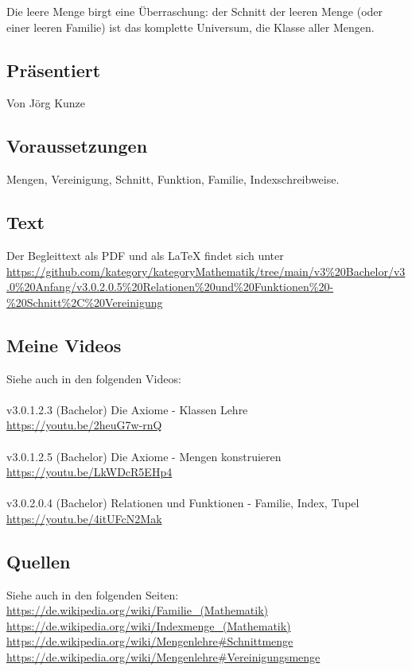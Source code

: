\documentclass[a4paper]{amsart}
\theoremstyle{definition}
\begin{document}
Die leere Menge birgt eine Überraschung: der Schnitt der leeren Menge (oder einer leeren Familie) ist das komplette Universum, die Klasse aller Mengen. 

\subsection*{Präsentiert}
Von Jörg Kunze

\subsection*{Voraussetzungen}
Mengen, Vereinigung, Schnitt, Funktion, Familie, Indexschreibweise.

\subsection*{Text}
Der Begleittext als PDF und als LaTeX findet sich unter
{\tiny
   \url{https://github.com/kategory/kategoryMathematik/tree/main/v3%20Bachelor/v3.0%20Anfang/v3.0.2.0.5%20Relationen%20und%20Funktionen%20-%20Schnitt%2C%20Vereinigung}
}

\subsection*{Meine Videos}
Siehe auch in den folgenden Videos:\\
\\
v3.0.1.2.3 (Bachelor) Die Axiome - Klassen Lehre\\
\url{https://youtu.be/2heuG7w-rnQ}\\
\\
v3.0.1.2.5 (Bachelor) Die Axiome - Mengen konstruieren\\
\url{https://youtu.be/LkWDcR5EHp4}\\
\\
v3.0.2.0.4 (Bachelor) Relationen und Funktionen - Familie, Index, Tupel\\
\url{https://youtu.be/4itUFcN2Mak}

\subsection*{Quellen}
Siehe auch in den folgenden Seiten:\\
\url{https://de.wikipedia.org/wiki/Familie_(Mathematik)}\\
\url{https://de.wikipedia.org/wiki/Indexmenge_(Mathematik)}\\
\url{https://de.wikipedia.org/wiki/Mengenlehre#Schnittmenge}\\
\url{https://de.wikipedia.org/wiki/Mengenlehre#Vereinigungsmenge}
\end{document}
